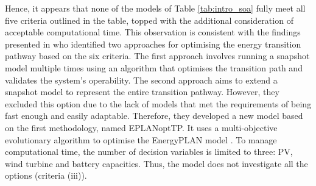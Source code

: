 
Hence, it appears that none of the models of Table \ref{tab:intro_soa} fully meet all five criteria outlined in the table, topped with the additional consideration of acceptable computational time. This observation is consistent with the findings presented in \cite{prina2019transition} who identified two approaches for optimising the energy transition pathway based on the six criteria. The first approach involves running a snapshot model multiple times using an algorithm that optimises the transition path and validates the system's operability. The second approach aims to extend a snapshot model to represent the entire transition pathway. However, they excluded this option due to the lack of models that met the requirements of being fast enough and easily adaptable. 
Therefore, they developed a new model based on the first methodology, named EPLANoptTP. It uses a multi-objective evolutionary algorithm to optimise the EnergyPLAN model \cite{lundenergyplan}. To manage computational time, the number of decision variables is limited to three: \gls{PV}, wind turbine and battery capacities. Thus, the model does not investigate all the options (\ie criteria (iii)). 



